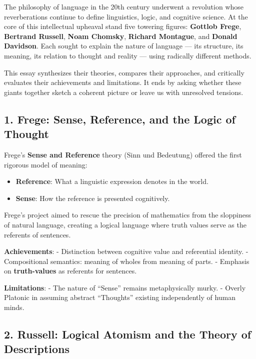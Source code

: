 \documentclass[12pt]{article}
\newcommand{\tightlist}{\itemsep 0pt\parskip 0pt\parsep 0pt}
\begin{document}
The philosophy of language in the 20th century underwent a revolution
whose reverberations continue to define linguistics, logic, and
cognitive science. At the core of this intellectual upheaval stand five
towering figures: \textbf{Gottlob Frege}, \textbf{Bertrand Russell},
\textbf{Noam Chomsky}, \textbf{Richard Montague}, and \textbf{Donald
Davidson}. Each sought to explain the nature of language --- its
structure, its meaning, its relation to thought and reality --- using
radically different methods.

This essay synthesizes their theories, compares their approaches, and
critically evaluates their achievements and limitations. It ends by
asking whether these giants together sketch a coherent picture or leave
us with unresolved tensions.

\hypertarget{frege-sense-reference-and-the-logic-of-thought}{%
\subsection{1. Frege: Sense, Reference, and the Logic of
Thought}\label{frege-sense-reference-and-the-logic-of-thought}}

Frege's \textbf{Sense and Reference} theory (Sinn und Bedeutung) offered
the first rigorous model of meaning:

\begin{itemize}
\tightlist
\item
  \textbf{Reference}: What a linguistic expression denotes in the world.
\item
  \textbf{Sense}: How the reference is presented cognitively.
\end{itemize}

Frege's project aimed to rescue the precision of mathematics from the
sloppiness of natural language, creating a logical language where truth
values serve as the referents of sentences.

\textbf{Achievements}: - Distinction between cognitive value and
referential identity. - Compositional semantics: meaning of wholes from
meaning of parts. - Emphasis on \textbf{truth-values} as referents for
sentences.

\textbf{Limitations}: - The nature of ``Sense'' remains metaphysically
murky. - Overly Platonic in assuming abstract ``Thoughts'' existing
independently of human minds.

\hypertarget{russell-logical-atomism-and-the-theory-of-descriptions}{%
\subsection{2. Russell: Logical Atomism and the Theory of
Descriptions}\label{russell-logical-atomism-and-the-theory-of-descriptions}}
\end{document}
